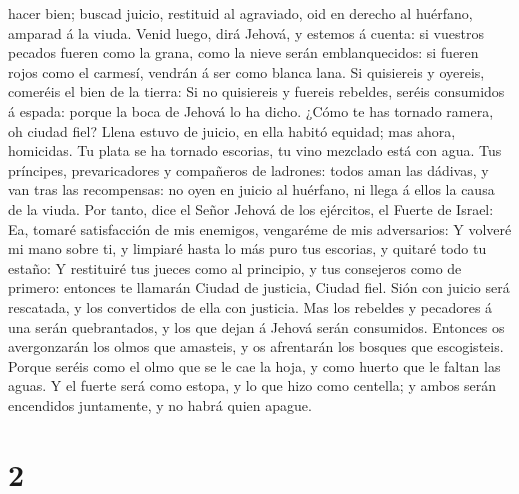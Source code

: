 hacer bien; buscad juicio, restituid al agraviado, oid en derecho al
huérfano, amparad á la viuda.  Venid luego, dirá Jehová, y
estemos á cuenta: si vuestros pecados fueren como la grana, como la
nieve serán emblanquecidos: si fueren rojos como el carmesí, vendrán á
ser como blanca lana.  Si quisiereis y oyereis, comeréis el
bien de la tierra:  Si no quisiereis y fuereis rebeldes,
seréis consumidos á espada: porque la boca de Jehová lo ha dicho.
 ¿Cómo te has tornado ramera, oh ciudad fiel? Llena estuvo
de juicio, en ella habitó equidad; mas ahora, homicidas. 
Tu plata se ha tornado escorias, tu vino mezclado está con agua.
 Tus príncipes, prevaricadores y compañeros de ladrones:
todos aman las dádivas, y van tras las recompensas: no oyen en juicio al
huérfano, ni llega á ellos la causa de la viuda.  Por
tanto, dice el Señor Jehová de los ejércitos, el Fuerte de Israel: Ea,
tomaré satisfacción de mis enemigos, vengaréme de mis adversarios:
 Y volveré mi mano sobre ti, y limpiaré hasta lo más puro
tus escorias, y quitaré todo tu estaño:  Y restituiré tus
jueces como al principio, y tus consejeros como de primero: entonces te
llamarán Ciudad de justicia, Ciudad fiel.  Sión con juicio
será rescatada, y los convertidos de ella con justicia. 
Mas los rebeldes y pecadores á una serán quebrantados, y los que dejan á
Jehová serán consumidos.  Entonces os avergonzarán los
olmos que amasteis, y os afrentarán los bosques que escogisteis.
 Porque seréis como el olmo que se le cae la hoja, y como
huerto que le faltan las aguas.  Y el fuerte será como
estopa, y lo que hizo como centella; y ambos serán encendidos
juntamente, y no habrá quien apague.

\hypertarget{section-1}{%
\section{2}\label{section-1}}

